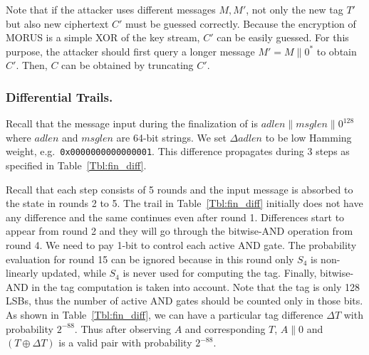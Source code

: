 Note that if the attacker uses different messages $M,M'$, not only the new tag $T'$ but also new ciphertext $C'$ must be guessed correctly. Because the encryption of MORUS is a simple XOR of the key stream, $C'$ can be easily guessed. For this purpose, the attacker should first query a longer message $M'=M\|0^*$ to obtain $C'$. Then, $C$ can be obtained by truncating $C'$.

\subsubsection{Differential Trails.}
Recall that the message input during the finalization of  is $adlen\|msglen\|0^{128}$ where $adlen$ and $msglen$ are 64-bit strings. We set $\Delta adlen$ to be low Hamming weight, e.g.~{\tt 0x0000000000000001}. 
This difference propagates during 3 steps as specified in Table~\ref{Tbl:fin_diff}.

Recall that each step consists of 5 rounds and the input message is absorbed to the state in rounds 2 to 5. The trail in Table~\ref{Tbl:fin_diff} initially does not have any difference and the same continues even after round 1. Differences start to appear from round 2 and they will go through the bitwise-AND operation from round 4. We need to pay 1-bit to control each active AND gate. The probability evaluation for round 15 can be ignored because in this round only $S_4$ is non-linearly updated, while $S_4$ is never used for computing the tag. Finally, bitwise-AND in the tag computation is taken into account. Note that the tag is only 128 LSBs, thus the number of active AND gates should be counted only in those bits. As shown in Table~\ref{Tbl:fin_diff}, we can have a particular tag difference $\Delta T$ with probability $2^{-88}$. Thus after observing $A$ and corresponding $T$, $A\|0$ and $(T \oplus \Delta T)$ is a valid pair with probability $2^{-88}$.

